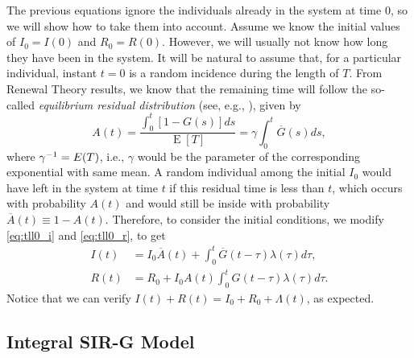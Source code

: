 \documentclass[USenglish,10pt]{article}
\newcommand{\Ab}{\overline{A}\xspace}
\newcommand{\Gb}{\overline{G}\xspace}
\newcommand{\gami}{\ensuremath\gamma^{-1}\xspace}
\DeclareMathOperator{\Exp}{E}       %
\begin{document}
The previous equations ignore the individuals already in the system at time 0, so we will show how to take them into account.
Assume we know the initial values of $I_0=I(0)$ and $R_0=R(0)$.
However, we will usually not know how long they have been in the system.
It will be natural to assume that, for a particular individual, instant $t=0$ is a random incidence during the length of $T$. From Renewal Theory results, we know that the remaining time will follow the so-called \emph{equilibrium residual distribution} (see, e.g., \cite{kulk95}), given by
\begin{equation}
A(t) =  \frac{\int_0^t[1-G(s)]ds}{\Exp{[T]}} = \gamma \int_0^t \Gb(s)ds,
\label{eq:eqdist}
\end{equation}
where $\gami=E(T)$, i.e., $\gamma$ would be the parameter of the corresponding exponential with same mean. A random individual among the initial $I_0$ would have left in the system at time $t$ if this residual time is less than $t$, which occurs with probability $A(t)$ and would still be inside with probability $\Ab(t)\equiv 1- A(t)$. Therefore, to consider the initial conditions, we modify \eqref{eq:tll0_i} and \eqref{eq:tll0_r}, to get
\begin{align}
I(t) &= I_0\Ab(t) +  \int_0^t \Gb(t-\tau) \lambda(\tau)d\tau,   \label{eq:tll0_i_ic} \\
R(t) &=  R_0 +  I_0A(t) \int_0^t G(t-\tau) \lambda(\tau)d\tau.  \label{eq:tll0_r_ic}
\end{align}
Notice that we can verify $I(t)+R(t)= I_0 +  R_0  + \Lambda(t)$, as expected.


\subsection{Integral SIR-G Model}
\end{document}
